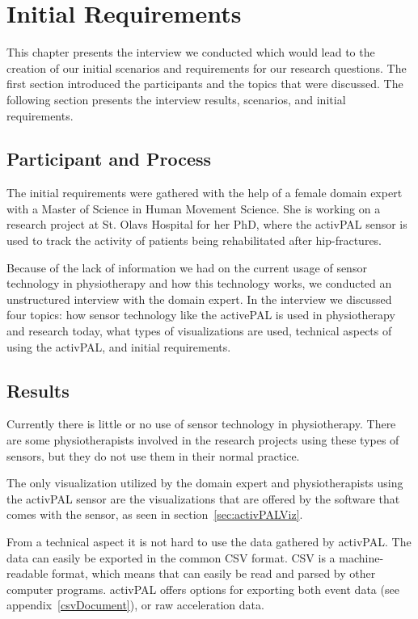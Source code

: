 \chapter{Initial Requirements}
\label{ch:initialRequirements}
This chapter presents the interview we conducted which would lead to the creation of our initial scenarios and requirements for our research questions. The first section introduced the participants and the topics that were discussed. The following section presents the interview results, scenarios, and initial requirements.

\section{Participant and Process}
\label{sec:reqGathering}
The initial requirements were gathered with the help of a female domain expert with a Master of Science in Human Movement Science. She is working on a research project at St. Olavs Hospital for her PhD, where the activPAL sensor is used to track the activity of patients being rehabilitated after hip-fractures.

Because of the lack of information we had on the current usage of sensor technology in physiotherapy and how this technology works, we conducted an unstructured interview with the domain expert. In the interview we discussed four topics: how sensor technology like the activePAL is used in physiotherapy and research today, what types of visualizations are used, technical aspects of using the activPAL, and initial requirements. 

\section{Results}
Currently there is little or no use of sensor technology in physiotherapy. There are some physiotherapists involved in the research projects using these types of sensors, but they do not use them in their normal practice. 

The only visualization utilized by the domain expert and physiotherapists using the activPAL sensor are the visualizations that are offered by the software that comes with the sensor, as seen in section~\ref{sec:activPALViz}.

From a technical aspect it is not hard to use the data gathered by activPAL. The data can easily be exported in the common CSV format. CSV is a machine-readable format, which means that can easily be read and parsed by other computer programs. activPAL offers options for exporting both event data (see appendix~\ref{csvDocument}), or raw acceleration data.

